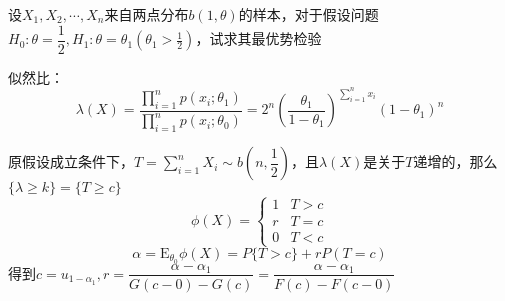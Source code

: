 \begin{example}
    设$X_1,X_2,\cdots,X_n$来自两点分布$b(1,\theta)$的样本，对于假设问题$H_0:\theta =\dfrac{1}{2},H_1:\theta = \theta_1(\theta_1>\frac{1}{2})$，试求其最优势检验
    
    似然比：
    \[
        \lambda(X) = \dfrac{\prod_{i = 1}^{n}p(x_i;\theta_1)}{\prod_{i = 1}^{n}p(x_i;\theta_0)} = 2^n\left( \dfrac{\theta_1}{1-\theta_1} \right)^{\sum_{i = 1}^{n}x_i}(1-\theta_1)^n
    \]

    原假设成立条件下，$T = \sum_{i = 1}^{n}X_i\sim b(n,\dfrac{1}{2})$，且$\lambda(X)$是关于$T$递增的，那么$\{\lambda\geq k\} = \{T\geq c\}$
    \[
        \phi(X) = \left\{
            \begin{array}{ll}
                1 & T > c\\
                r & T = c\\
                0 & T < c
            \end{array}
        \right.
    \]
    \[
        \alpha = \mathrm{E}_{\theta_0}\phi(X) = P\{T>c\} + rP(T = c) 
    \]
    得到$c = u_{1-\alpha_1},r = \dfrac{\alpha-\alpha_1}{G(c-0)-G(c)} = \dfrac{\alpha-\alpha_1}{F(c)-F(c-0)}$
\end{example}

